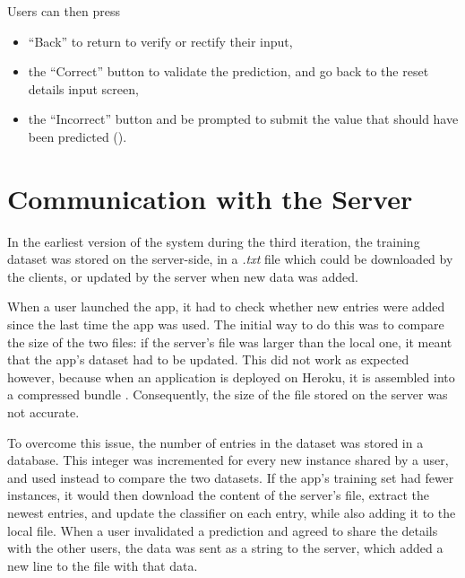 \documentclass{mproj}
\begin{document}
Users can then press
\begin{itemize}[topsep=0pt]
	\item ``Back'' to return to verify or rectify their input,
	\item the ``Correct'' button to validate the prediction, and go back to the reset details input screen,
	\item the ``Incorrect'' button and be prompted to submit the value that should have been predicted ().
\end{itemize}

\begin{figure}[h]
	\centering
	
\end{figure}

\section{Communication with the Server}

In the earliest version of the system during the third iteration, the training dataset was stored on the server-side, in a \textit{.txt} file which could be downloaded by the clients, or updated by the server when new data was added. \par

When a user launched the app, it had to check whether new entries were added since the last time the app was used. The initial way to do this was to compare the size of the two files: if the server's file was larger than the local one, it meant that the app's dataset had to be updated. This did not work as expected however, because when an application is deployed on Heroku, it is assembled into a compressed bundle \cite{herokuslug}. Consequently, the size of the file stored on the server was not accurate. \par 

To overcome this issue, the number of entries in the dataset was stored in a database. This integer was incremented for every new instance shared by a user, and used instead to compare the two datasets. If the app's training set had fewer instances, it would then download the content of the server's file, extract the newest entries, and update the classifier on each entry, while also adding it to the local file. When a user invalidated a prediction and agreed to share the details with the other users, the data was sent as a string to the server, which added a new line to the file with that data.\par
\end{document}
